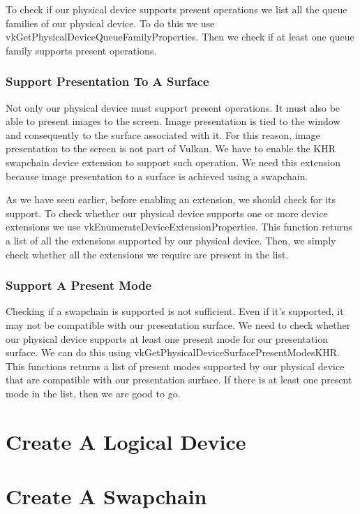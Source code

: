 To check if our physical device supports present operations we list all
the queue families of our physical device.
To do this we use vkGetPhysicalDeviceQueueFamilyProperties.
Then we check if at least one queue family supports present operations.

\begin{minipage}{\linewidth}{\noindent}
    
\end{minipage}

\subsubsection{Support Presentation To A Surface}

Not only our physical device must support present operations.
It must also be able to present images to the screen.
Image presentation is tied to the window and consequently to the surface
associated with it.
For this reason, image presentation to the screen is not part of Vulkan.
We have to enable the KHR swapchain device extension to support such operation.
We need this extension because image presentation to a surface is achieved using
a swapchain.

\begin{minipage}{\linewidth}{\noindent}
    
\end{minipage}

As we have seen earlier, before enabling an extension, we should check for its
support.
To check whether our physical device supports one or more device extensions we use
vkEnumerateDeviceExtensionProperties.
This function returns a list of all the extensions supported by our physical device.
Then, we simply check whether all the extensions we require are present in the list.

\subsubsection{Support A Present Mode}

Checking if a swapchain is supported is not sufficient.
Even if it's supported, it may not be compatible with our presentation surface.
We need to check whether our physical device supports at least one present mode
for our presentation surface.
We can do this using vkGetPhysicalDeviceSurfacePresentModesKHR.
This functions returns a list of present modes supported by our physical device
that are compatible with our presentation surface.
If there is at least one present mode in the list, then we are good to go.

\section{Create A Logical Device}

\section{Create A Swapchain}
